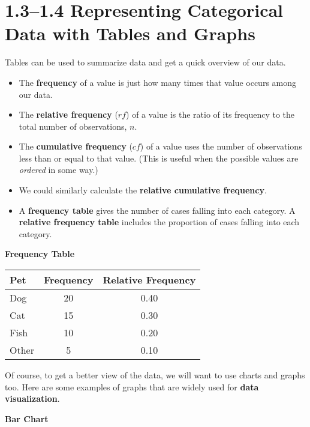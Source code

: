 \section*{1.3--1.4 Representing Categorical Data with Tables and Graphs}
Tables can be used to summarize data and get a quick overview of our data. 
\begin{tcolorbox}[title=Key Terms, colback=blue!5!white, colframe=blue!75!black, breakable]
\begin{itemize}
    \item The \textbf{frequency} of a value is just how many times that value occurs among our data.
    \item The \textbf{relative frequency} ($rf$) of a value is the ratio of its frequency to the total number of observations, $n$.
    \item The \textbf{cumulative frequency} ($cf$) of a value uses the number of observations less than or equal to that value. (This is useful when the possible values are \textit{ordered} in some way.)
    \item We could similarly calculate the \textbf{relative cumulative frequency}.
    \item A \textbf{frequency table} gives the number of cases falling into each category. A \textbf{relative frequency table} includes the proportion of cases falling into each category.
\end{itemize}
\end{tcolorbox}
\par\medskip
\textbf{Frequency Table}
\begin{center}
\begin{tabular}{lcc}
\toprule
Pet & Frequency & Relative Frequency \\
\midrule
Dog & 20 & 0.40 \\
Cat & 15 & 0.30 \\
Fish & 10 & 0.20 \\
Other & 5 & 0.10 \\
\bottomrule
\end{tabular}
\end{center}
\par\medskip
Of course, to get a better view of the data, we will want to use charts and graphs too. Here are some examples of graphs that are widely used for \textbf{data visualization}. \\
\par\medskip
\textbf{Bar Chart}
\begin{center}
\end{center}
